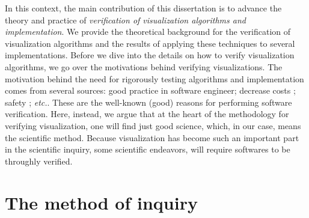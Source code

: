 In this context, the main contribution of this dissertation is to advance the theory and practice of \emph{verification of visualization algorithms and implementation}.  
%
We provide the theoretical background for the verification of visualization algorithms and the results of applying these techniques to several implementations. 
%
Before we dive into the details on how to verify visualization algorithms, we go over the motivations behind verifying visualizations. 
%
The motivation behind the need for rigorously testing algorithms and implementation comes from several sources: good practice in software engineer; decrease costs \cite{reports}; safety \cite{automobile,nuclear,stuff}; \emph{etc.}. These are the well-known (good) reasons for performing software verification. Here, instead, we  argue that  at the heart of the methodology for verifying visualization, one will find just good science, which, in our case, means  the scientific method. Because visualization has become such an important part in the scientific inquiry, some scientific endeavors, will require softwares to be throughly verified.
	
\section{The method of inquiry}

